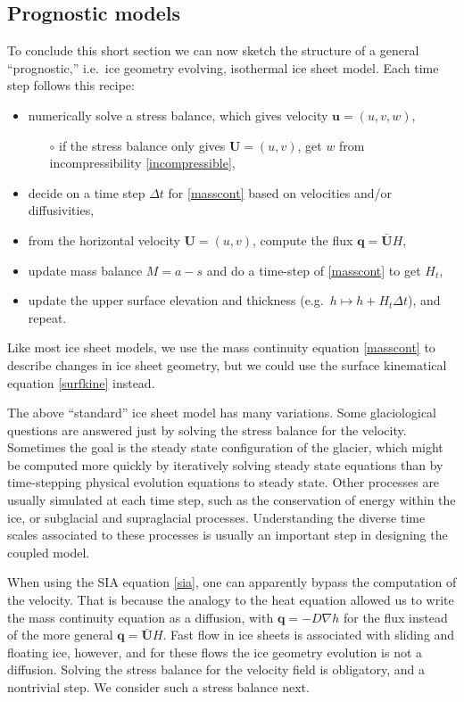 \documentclass[letterpaper,final,12pt,reqno]{amsart}
\newcommand{\bq}{\mathbf{q}}
\newcommand{\bU}{\mathbf{U}}
\begin{document}
\subsection*{Prognostic models}  To conclude this short section we can now sketch the structure of a general ``prognostic,'' i.e.~ice geometry evolving, isothermal ice sheet model.  Each time step follows this recipe:
  \begin{itemize}
  \item numerically solve a stress balance, which gives velocity $\mathbf{u}=(u,v,w)$,
    \begin{itemize}
    \item[$\circ$] if the stress balance only gives $\mathbf{U}=(u,v)$, get $w$ from incompressibility \eqref{incompressible},
    \end{itemize}
  \item decide on a time step $\Delta t$ for \eqref{masscont} based on velocities and/or diffusivities,
  \item from the horizontal velocity $\mathbf{U}=(u,v)$, compute the flux $\bq = \bar{\bU} H$,
  \item update mass balance $M=a-s$ and do a time-step of \eqref{masscont} to get $H_t$,
  \item update the upper surface elevation and thickness (e.g.~$h \mapsto h + H_t \Delta t$), and repeat.
  \end{itemize}
Like most ice sheet models, we use the mass continuity equation \eqref{masscont} to describe changes in ice sheet geometry, but we could use the surface kinematical equation \eqref{surfkine} instead.

The above ``standard'' ice sheet model has many variations.  Some glaciological questions are answered just by solving the stress balance for the velocity.  Sometimes the goal is the steady state configuration of the glacier, which might be computed more quickly by iteratively solving steady state equations than by time-stepping physical evolution equations to steady state.  Other processes are usually simulated at each time step, such as the conservation of energy within the ice, or subglacial and supraglacial processes.  Understanding the diverse time scales associated to these processes is usually an important step in designing the coupled model.

When using the SIA equation \eqref{sia}, one can apparently bypass the computation of the velocity.  That is because the analogy to the heat equation allowed us to write the mass continuity equation as a diffusion, with $\bq=-D\nabla h$ for the flux instead of the more general $\bq = \bar{\bU} H$.  Fast flow in ice sheets is associated with sliding and floating ice, however, and for these flows the ice geometry evolution is not a diffusion.  Solving the stress balance for the velocity field is obligatory, and a nontrivial step.  We consider such a stress balance next.
\end{document}
